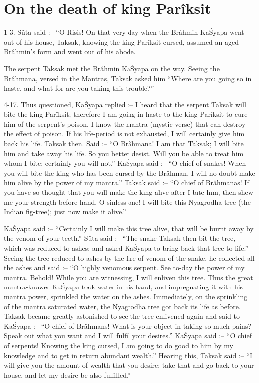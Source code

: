 ﻿\chapter{On the death of king Par\^iksit}

1-3. S\^uta said :-- ``O Risis! On that very day when the Br\^ahmin Ka\'Syapa went out of his house, Taksak, knowing the king Par\^iksit cursed, assumed an aged Br\^ahmin's form and went out of his abode.

The serpent Taksak met the Br\^ahmin Ka\'Syapa on the way. Seeing the Br\^ahmana, versed in the Mantras, Taksak asked him ``Where are you going so in haste, and what for are you taking this trouble?''

4-17. Thus questioned, Ka\'Syapa replied :-- I heard that the serpent Taksak will bite the king Par\^iksit; therefore I am going in haste to the king Par\^iksit to cure him of the serpent's poison. I know the mantra (mystic verse) that can destroy the effect of poison. If his life-period is not exhausted, I will certainly give him back his life. Taksak then. Said :-- ``O Br\^ahmana! I am that Taksak; I will bite him and take away his life. So you better desist. Will you be able to treat him whom I bite; certainly you will not.'' Ka\'Syapa said :-- ``O chief of snakes! When you will bite the king who has been cursed by the Br\^ahman, I will no doubt make him alive by the power of my mantra.'' Taksak said :-- ``O chief of Br\^ahmanas! If you have so thought that you will make the king alive after I bite him, then shew me your strength before hand. O sinless one! I will bite this Nyagrodha tree (the Indian fig-tree); just now make it alive.''

Ka\'Syapa said :-- ``Certainly I will make this tree alive, that will be burnt away by the venom of your teeth.'' S\^uta said :-- ``The snake Taksak then bit the tree, which was reduced to ashes; and asked Ka\'Syapa to bring back that tree to life.'' Seeing the tree reduced to ashes by the fire of venom of the snake, he collected all the ashes and said :-- ``O highly venomous serpent. See to-day the power of my mantra. Behold! While you are witnessing, I will enliven this tree. Thus the great mantra-knower Ka\'Syapa took water in his hand, and impregnating it with his mantra power, sprinkled the water on the ashes. Immediately, on the sprinkling of the mantra saturated water, the Nyagrodha tree got back its life as before. Taksak became greatly astonished to see the tree enlivened again and said to Ka\'Syapa :-- ``O chief of Br\^ahmans! What is your object in taking so much pains? Speak out what you want and I will fulfil your desires.'' Ka\'Syapa said :-- ``O chief of serpents! Knowing the king cursed, I am going to do good to him by my knowledge and to get in return abundant wealth.'' Hearing this, Taksak said :-- ``I will give you the amount of wealth that you desire; take that and go back to your house, and let my desire be also fulfilled.''

